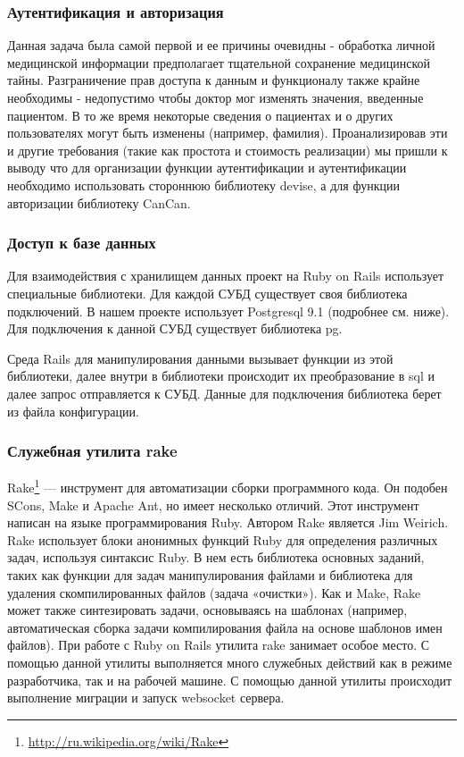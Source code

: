 \subsubsection{Аутентификация и авторизация}
Данная задача была самой первой и ее причины очевидны - обработка личной
медицинской информации предполагает тщательной сохранение медицинской тайны.
Разграничение прав доступа к данным и функционалу также крайне необходимы -
недопустимо чтобы доктор мог изменять значения, введенные пациентом. В то же
время некоторые сведения о пациентах и о других пользователях могут быть
изменены (например, фамилия).
Проанализировав эти и другие требования (такие как простота и стоимость
реализации) мы пришли к выводу что для организации функции аутентификации и
аутентификации необходимо использовать стороннюю библиотеку devise, а для
функции авторизации библиотеку CanCan.

\subsubsection{Доступ к базе данных}
Для взаимодействия с хранилищем данных проект на Ruby on Rails использует
специальные библиотеки. Для каждой СУБД существует своя библиотека подключений.
В нашем проекте использует Postgresql 9.1 (подробнее см. ниже). Для подключения
к данной СУБД существует библиотека pg.
    
Среда Rails для манипулирования данными вызывает функции из этой библиотеки,
далее внутри в библиотеки происходит их преобразование в sql и далее запрос
отправляется к СУБД. Данные для подключения библиотека берет из файла
конфигурации.

\subsubsection{Служебная утилита rake}
Rake\footnote{
	\url{http://ru.wikipedia.org/wiki/Rake}
} — инструмент для автоматизации сборки программного кода. Он подобен
SCons, Make и Apache Ant, но имеет несколько отличий. Этот инструмент написан на языке
программирования Ruby. Автором Rake является Jim Weirich.
Rake использует блоки анонимных функций Ruby для определения различных задач,
используя синтаксис Ruby. В нем есть библиотека основных заданий, таких как
функции для задач манипулирования файлами и библиотека для удаления
скомпилированных файлов (задача «очистки»). Как и Make, Rake может также
синтезировать задачи, основываясь на шаблонах (например, автоматическая сборка
задачи компилирования файла на основе шаблонов имен файлов).
При работе с Ruby on Rails утилита rake занимает особое место. С помощью данной
утилиты выполняется много служебных действий как в режиме разработчика, так и на
рабочей машине. С помощью данной утилиты происходит выполнение миграции и запуск
websocket сервера.

